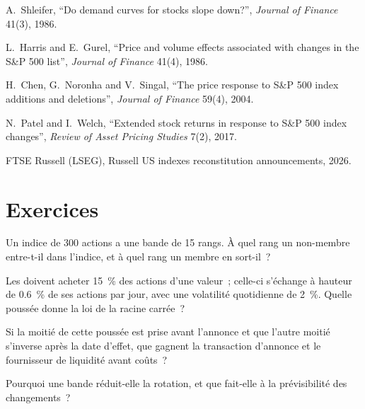 \begin{omsources}
\item A.~Shleifer, ``Do demand curves for stocks slope down?'', \emph{Journal of Finance} 41(3), 1986.
\item L.~Harris and E.~Gurel, ``Price and volume effects associated with changes in the S\&P 500 list'', \emph{Journal of Finance} 41(4), 1986.
\item H.~Chen, G.~Noronha and V.~Singal, ``The price response to S\&P 500 index additions and deletions'', \emph{Journal of Finance} 59(4), 2004.
\item N.~Patel and I.~Welch, ``Extended stock returns in response to S\&P 500 index changes'', \emph{Review of Asset Pricing Studies} 7(2), 2017.
\item FTSE Russell (LSEG), Russell US indexes reconstitution announcements, 2026.
\end{omsources}

\section{Exercices}

\begin{exercise}[$\star$]\label{exo:s1:index-rebalancing:1}
Un indice de 300 actions a une bande de 15 rangs. À quel rang un non-membre entre-t-il dans l'indice, et à quel rang un membre en sort-il~?
\end{exercise}

\begin{exercise}[$\star$]\label{exo:s1:index-rebalancing:2}
Les  doivent acheter 15~\% des actions d'une valeur~; celle-ci s'échange à hauteur de 0.6~\% de ses actions par jour, avec une volatilité quotidienne de 2~\%. Quelle poussée donne la loi de la racine carrée~?
\end{exercise}

\begin{exercise}[$\star$]\label{exo:s1:index-rebalancing:3}
Si la moitié de cette poussée est prise avant l'annonce et que l'autre moitié s'inverse après la date d'effet, que gagnent la transaction d'annonce et le fournisseur
de liquidité avant coûts~?
\end{exercise}

\begin{exercise}[$\star\star$]\label{exo:s1:index-rebalancing:4}
Pourquoi une bande réduit-elle la rotation, et que fait-elle à la prévisibilité des changements~?
\end{exercise}

